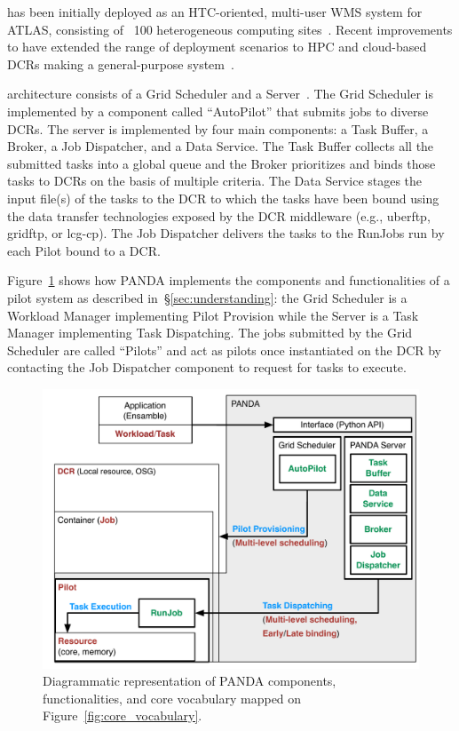 \documentclass{sig-alternate}
\begin{document}
\panda has been initially deployed as an HTC-oriented, multi-user WMS system for
ATLAS, consisting of ~100 heterogeneous computing sites~\cite{maeno2012pd2p}.
Recent improvements to \panda have extended the range of deployment scenarios to
HPC and cloud-based DCRs making \panda a general-purpose \pilot
system~\cite{nilsson2012recentrp}.

\panda architecture consists of a Grid Scheduler and a \panda
Server~\cite{panda_architecture_url,maeno2011overview}. The Grid Scheduler is
implemented by a component called ``AutoPilot'' that submits jobs to diverse
DCRs. The \panda server is implemented by four main components: a Task Buffer, a
Broker, a Job Dispatcher, and a Data Service. The Task Buffer collects all the
submitted tasks into a global queue and the Broker prioritizes and binds those
tasks to DCRs on the basis of multiple criteria. The Data Service stages the
input file(s) of the tasks to the DCR to which the tasks have been bound using
the data transfer technologies exposed by the DCR middleware (e.g., uberftp,
gridftp, or lcg-cp). The Job Dispatcher delivers the tasks to the RunJobs
run by each Pilot bound to a DCR.

Figure~\ref{fig:panda_comparison} shows how PANDA implements the components and
functionalities of a pilot system as described in~\S\ref{sec:understanding}: the
Grid Scheduler is a Workload Manager implementing Pilot Provision while the
\panda Server is a Task Manager implementing Task Dispatching. The jobs
submitted by the Grid Scheduler are called ``Pilots'' and act as pilots once
instantiated on the DCR by contacting the Job Dispatcher component to request
for tasks to execute.

\begin{figure}[t]
    \centering
        \includegraphics[width=.48\textwidth]{figures/panda_comparison.pdf}
    \caption{Diagrammatic representation of PANDA components, functionalities,
    and core vocabulary mapped on Figure~\ref{fig:core_vocabulary}.}
    \label{fig:panda_comparison}
\end{figure}
\end{document}
